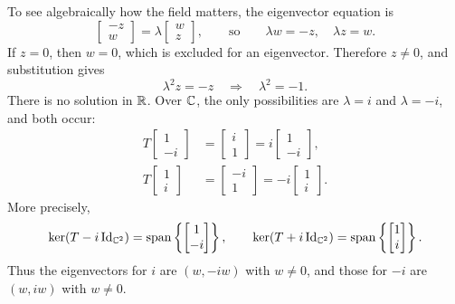 \begin{example}
  To see algebraically how the field matters, the eigenvector
  equation is
  \[
    \begin{bmatrix}-z\\w\end{bmatrix}
      =\lambda\begin{bmatrix}w\\z\end{bmatrix},
    \qquad\text{so}\qquad
    \lambda w=-z,\quad \lambda z=w.
  \]
  If $z=0$, then $w=0$, which is excluded for an eigenvector.
  Therefore $z\neq0$, and substitution gives
  \[
    \lambda^2z=-z
      \quad\Longrightarrow\quad \lambda^2=-1.
  \]
  There is no solution in $\mathbb{R}$. Over $\mathbb{C}$, the only
  possibilities are $\lambda=i$ and $\lambda=-i$, and both
  occur:
  \begin{align*}
    T\begin{bmatrix}1\\-i\end{bmatrix}
      &=\begin{bmatrix}i\\1\end{bmatrix}
        =i\begin{bmatrix}1\\-i\end{bmatrix},\\
    T\begin{bmatrix}1\\i\end{bmatrix}
      &=\begin{bmatrix}-i\\1\end{bmatrix}
        =-i\begin{bmatrix}1\\i\end{bmatrix}.
  \end{align*}
  More precisely,
  \[
    \ker(T-i\operatorname{Id}_{\mathbb{C}^2})
      =\operatorname{span}\left\{\begin{bmatrix}1\\-i\end{bmatrix}\right\},
    \qquad
    \ker(T+i\operatorname{Id}_{\mathbb{C}^2})
      =\operatorname{span}\left\{\begin{bmatrix}1\\i\end{bmatrix}\right\}.
  \]
  Thus the eigenvectors for $i$ are $(w,-iw)$ with $w\neq0$,
  and those for $-i$ are $(w,iw)$ with $w\neq0$.
\end{example}

